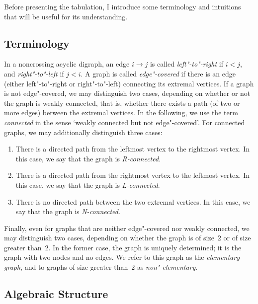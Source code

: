 \documentclass[a4paper]{article}
\begin{document}
Before presenting the tabulation, I introduce some terminology and intuitions that will be useful for its understanding.

\subsection{Terminology}
\label{sec:Terminology}

In a noncrossing acyclic digraph, an edge $i \to j$ is called \emph{left"-to"-right} if $i < j$, and \emph{right"-to"-left} if $j < i$.
A graph is called \emph{edge"-covered} if there is an edge (either left"-to"-right or right"-to"-left) connecting its extremal vertices.
If a graph is not edge"-covered, we may distinguish two cases, depending on whether or not the graph is weakly connected, that is, whether there exists a path (of two or more edges) between the extremal vertices.
In the following, we use the term \emph{connected} in the sense `weakly connected but not edge"-covered'.
For connected graphs, we may additionally distinguish three cases:
\begin{enumerate}
	\item There is a directed path from the leftmost vertex to the rightmost vertex. In this case, we say that the graph is \emph{R-connected}.
	\item There is a directed path from the rightmost vertex to the leftmost vertex. In this case, we say that the graph is \emph{L-connected}.
	\item There is no directed path between the two extremal vertices. In this case, we say that the graph is \emph{N-connected}.
\end{enumerate}
Finally, even for graphs that are neither edge"-covered nor weakly connected, we may distinguish two cases, depending on whether the graph is of size~$2$ or of size greater than~$2$.
In the former case, the graph is uniquely determined; it is the graph with two nodes and no edges.
We refer to this graph as the \emph{elementary graph}, and to graphs of size greater than~$2$ as \emph{non"-elementary}.

\subsection{Algebraic Structure}
\end{document}
